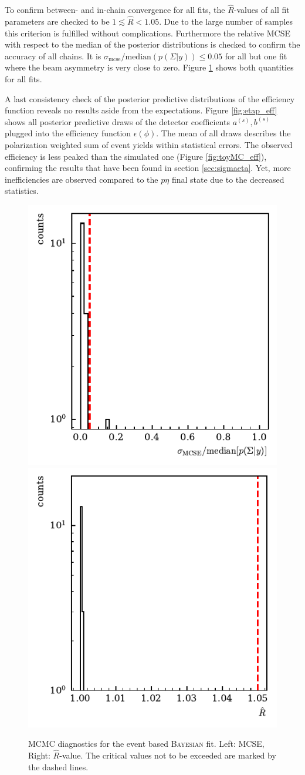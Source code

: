 To confirm between- and in-chain convergence for all fits, the $\widehat{R}$-values of all fit parameters are checked to be $1\lesssim\widehat{R}<1.05$. Due to the large number of samples this criterion is fulfilled without complications. Furthermore the relative MCSE with respect to the median of the posterior distributions is checked to confirm the accuracy of all chains. It is $\sigma_\text{mcse}/\text{median}\left(p(\Sigma|y)\right)\leq0.05$ for all but one fit where the beam asymmetry is very close to zero. Figure \ref{fig:etapdiagnostics} shows both quantities for all fits.

A last consistency check of the posterior predictive distributions of the efficiency function reveals no results aside from the expectations. Figure \ref{fig:etap_eff} shows all posterior predictive draws of the detector coefficients $a^{(s)},b^{(s)}$ plugged into the efficiency function $\epsilon\left(\phi\right)$. The mean of all draws describes the polarization weighted sum of event yields within statistical errors. The observed efficiency is less peaked than the simulated one (Figure \ref{fig:toyMC_eff}), confirming the results that have been found in section \ref{sec:sigmaeta}. Yet, more inefficiencies are observed compared to the $p\eta$ final state due to the decreased statistics.
\begin{figure}[htbp]
	\centering
	\includegraphics[width=.49\linewidth]{../bayes/etap_event_based_fit/plots/mcse_hist.pdf}
	\includegraphics[width=.49\linewidth]{../bayes/etap_event_based_fit/plots/rhat_hist.pdf}
	\caption{MCMC diagnostics for the event based \textsc{Bayesian} fit. Left: MCSE, Right: $\widehat{R}$-value. The critical values not to be exceeded are marked by the dashed lines.}
	\label{fig:etapdiagnostics}
\end{figure}
